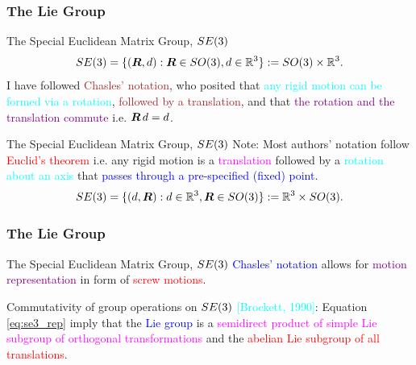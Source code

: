 \begin{frame}
	\frametitle{The Lie Group}	
	\begin{block}{The Special Euclidean Matrix Group, ${SE}(3)$}
		\begin{align}
			{SE}(3) = \{(\bm{R}, d): \bm{R} \in SO(3), d \in \mathbb{R}^3 \}:=SO(3) \times \mathbb{R}^3.
			\label{eq:se3_rep}
		\end{align}
		 \footnotesize{I have followed \textcolor{brown}{Chasles' notation}, who posited that \textcolor{cyan}{any rigid motion can be formed via a rotation}, \textcolor{brown}{followed by a translation}, and that \textcolor{purple}{the rotation and the translation commute} i.e. $\bm{R} \, d = d$}.
	\end{block}

	\begin{block}{The Special Euclidean Matrix Group, ${SE}(3)$}
		\footnotesize{Note: Most authors' notation follow \textcolor{red}{Euclid's theorem} i.e. any rigid motion is a \textcolor{magenta}{translation} followed by a \textcolor{cyan}{rotation about an axis} that \textcolor{blue}{passes through a pre-specified (fixed) point}.}	
		\begin{align}
			{SE}(3) = \{(d, \bm{R}):  d \in \mathbb{R}^3, \bm{R} \in SO(3) 	\}:=  \mathbb{R}^3 \times SO(3).
			\label{eq:se3_rep_euclid}
		\end{align}
	\end{block}
\end{frame}

\begin{frame}
	\frametitle{The Lie Group}		
	\begin{block}{The Special Euclidean Matrix Group, ${SE}(3)$}
		\textcolor{blue}{Chasles' notation} allows for \textcolor{purple}{motion representation} in form of \textcolor{red}{screw motions}.
	\end{block}
	
	\begin{block}{Commutativity of group operations on ${SE}(3)$}
		\textcolor{cyan}{[Brockett, 1990]}: Equation \eqref{eq:se3_rep} %
		imply that the \textcolor{blue}{Lie group} is a \textcolor{magenta}{semidirect product of simple Lie subgroup of orthogonal transformations} and the \textcolor{red}{abelian Lie subgroup of all translations}.
	\end{block}
\end{frame}



